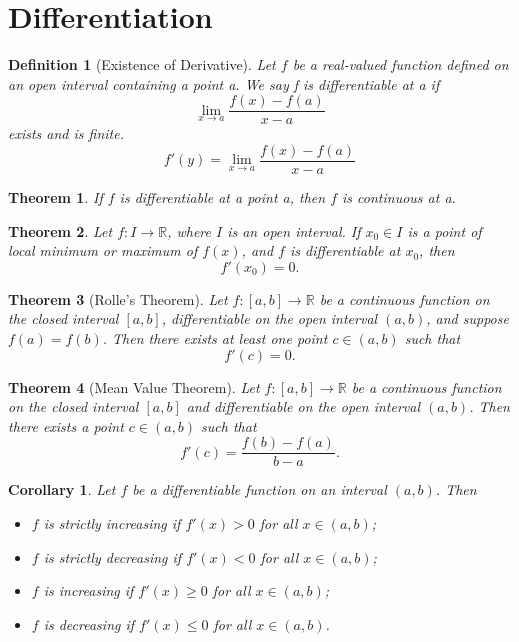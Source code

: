 \documentclass{article}
\newtheorem{definition}{Definition}
\newtheorem{theorem}{Theorem}
\newtheorem{corollary}{Corollary}
\begin{document}
\section*{Differentiation}
\begin{definition}[Existence of Derivative]
Let \( f\) be a real-valued function defined on an open interval containing
a point a. We say f is differentiable at a if
\[
\lim_{x \to a} \frac{f(x) - f(a)}{x - a}
\]
exists and is finite.
\[
f'(y) = \lim_{x \to a} \frac{f(x) - f(a)}{x - a}
\]
\end{definition}
\begin{theorem}
If \(f\) is differentiable at a point a, then \(f\) is continuous at a.
\end{theorem}
\begin{theorem}
Let \( f : I \to \mathbb{R} \), where \( I \) is an open interval. If \( x_0 \in I \) is a point of local minimum or maximum of \( f(x) \), and \( f \) is differentiable at \( x_0 \), then
\[
f'(x_0) = 0.
\]
\end{theorem}
\begin{theorem} [Rolle's Theorem]
Let \( f: [a, b] \to \mathbb{R} \) be a continuous function on the closed interval \( [a, b] \), differentiable on the open interval \( (a, b) \), and suppose \( f(a) = f(b) \). Then there exists at least one point \( c \in (a, b) \) such that
\[
f'(c) = 0.
\]
\end{theorem}
\begin{theorem} [Mean Value Theorem]
Let $f: [a, b] \to \mathbb{R}$ be a continuous function on the closed interval $[a, b]$ and differentiable on the open interval $(a, b)$. Then there exists a point $c \in (a, b)$ such that
\[
f'(c) = \frac{f(b) - f(a)}{b - a}.
\]
\end{theorem}
\begin{corollary}
Let \( f \) be a differentiable function on an interval \( (a, b) \). Then
\begin{itemize}
    \item[(i)] \( f \) is strictly increasing if \( f'(x) > 0 \) for all \( x \in (a, b) \);
    \item[(ii)] \( f \) is strictly decreasing if \( f'(x) < 0 \) for all \( x \in (a, b) \);
    \item[(iii)] \( f \) is increasing if \( f'(x) \geq 0 \) for all \( x \in (a, b) \);
    \item[(iv)] \( f \) is decreasing if \( f'(x) \leq 0 \) for all \( x \in (a, b) \).
\end{itemize}
\end{corollary}
\end{document}
